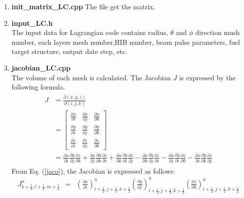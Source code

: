 \begin{enumerate}
\item {\bf init\_matrix\_LC.cpp}
The file get the matrix.


\item {\bf input\_LC.h}\\
The input data for Lagrangian code contains radius, $\theta$ and $\phi$ direction mush number, each layers mesh number,HIB number, beam pulse parameters, fuel target structure,  output date step, etc. 

\item {\bf jacobian\_LC.cpp}\\
 The volume of each mesh is calculated. The Jacobian $J$ is expressed by the following formula. 
\begin{eqnarray}\label{jaco}
\begin{split}
	J
	&=\frac{\partial (x,y,z)}{\partial (i,j,k)}\\
	&=\left[
	\begin{array}{rrr}
	\frac{\partial x}{\partial i} & \frac{\partial x}{\partial j} & \frac{\partial x}{\partial k} \\
	\frac{\partial y}{\partial i} & \frac{\partial y}{\partial j} & \frac{\partial y}{\partial k} \\
	\frac{\partial z}{\partial i} & \frac{\partial z}{\partial j} & \frac{\partial z}{\partial k} 
	\end{array}
	\right]\\
	&=\frac{\partial x}{\partial i}\frac{\partial y}{\partial j}\frac{\partial z}{\partial k}+\frac{\partial x}{\partial j}\frac{\partial y}{\partial k}\frac{\partial z}{\partial i}+\frac{\partial x}{\partial k}\frac{\partial y}{\partial i}\frac{\partial z}{\partial j}
	-\frac{\partial x}{\partial k}\frac{\partial y}{\partial j}\frac{\partial z}{\partial i}-\frac{\partial x}{\partial j}\frac{\partial y}{\partial i}\frac{\partial z}{\partial k}-\frac{\partial x}{\partial i}\frac{\partial y}{\partial k}\frac{\partial z}{\partial j}
\end{split}
\end{eqnarray}
	From Eq. (\ref {jaco}), the Jacobian is expressed as follows: 
	\begin{eqnarray}\label{Ja_R}
	J^n_{k+\frac{1}{2},l+\frac{1}{2},m+\frac{1}{2}}&=&
\left(\frac{\partial x}{\partial i}\right)^n_{i+\frac{1}{2},j+\frac{1}{2},k+\frac{1}{2}}
\left(\frac{\partial y}{\partial j}\right)^n_{i+\frac{1}{2},j+\frac{1}{2},k+\frac{1}{2}}
\left(\frac{\partial z}{\partial k}\right)^n_{i+\frac{1}{2},j+\frac{1}{2},k+\frac{1}{2}}\nonumber\\

\end{eqnarray}
\end{enumerate}
